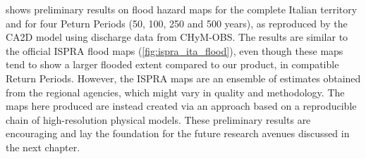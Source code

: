  shows preliminary results on flood hazard maps for the complete Italian territory and for four Peturn Periods (50, 100, 250 and 500 years), as reproduced by the CA2D model using discharge data from CHyM-OBS.
The results are similar to the official ISPRA flood maps (\cref{fig:ispra_ita_flood}), even though these maps tend to show a larger flooded extent compared to our product, in compatible Return Periods.
However, the ISPRA maps are an ensemble of estimates obtained from the regional agencies, which might vary in quality and methodology.
The maps here produced are instead created via an approach based on a reproducible chain of high-resolution physical models.
These preliminary results are encouraging and lay the foundation for the future research avenues discussed in the next chapter.
